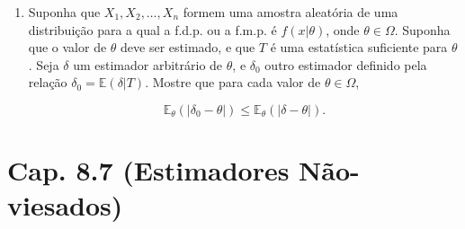 \documentclass[leqno, 12pt]{article}
\theoremstyle{definition}
\newcommand{\rs}{X_1, X_2, \ldots, X_n} %
\begin{document}
\begin{enumerate}
\item \textbf{\parencite[ex. 10, pág. 461]{DeGroot:2014}} Suponha que \(\rs\) formem uma amostra aleatória de uma distribuição para a qual a f.d.p. ou a f.m.p. é \(f(x|\theta)\), onde \(\theta \in \Omega \). Suponha que o valor de \(\theta\) deve ser estimado, e que \(T\) é uma estatística suficiente para \(\theta\). Seja \(\delta\) um estimador arbitrário de \(\theta\), e \(\delta_0\) outro estimador definido pela relação \(\delta_0 = \mathbb{E}(\delta|T)\). Mostre que para cada valor de \(\theta \in \Omega \), 

\[\mathbb{E}_{\theta}(|\delta_0 - \theta|) \leq \mathbb{E}_{\theta}(|\delta - \theta|).\]


\end{enumerate}

\section*{Cap. 8.7 (Estimadores Não-viesados)}
\end{document}
